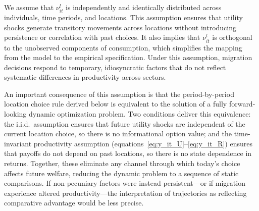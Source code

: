 We assume that $\nu_{it}^l$ is independently and identically distributed across individuals, time periods, and locations. 
This assumption ensures that utility shocks generate transitory movements across locations without introducing persistence or correlation with past choices.
It also implies that $\nu_{it}^{l}$ is orthogonal to the unobserved components of consumption, which simplifies the mapping from the model to the empirical specification.
Under this assumption, migration decisions respond to temporary, idiosyncratic factors that do not reflect systematic differences in productivity across sectors.

An important consequence of this assumption is that the period-by-period location choice rule derived below is equivalent to the solution of a fully forward-looking dynamic optimization problem.
Two conditions deliver this equivalence: the i.i.d.\ assumption ensures that future utility shocks are independent of the current location choice, so there is no informational option value; and the time-invariant productivity assumption (equations~\ref{eq:y_it_U}--\ref{eq:y_it_R}) ensures that payoffs do not depend on past locations, so there is no state dependence in returns.
Together, these eliminate any channel through which today's choice affects future welfare, reducing the dynamic problem to a sequence of static comparisons.
If non-pecuniary factors were instead persistent---or if migration experience altered productivity---the interpretation of trajectories as reflecting comparative advantage would be less precise.

